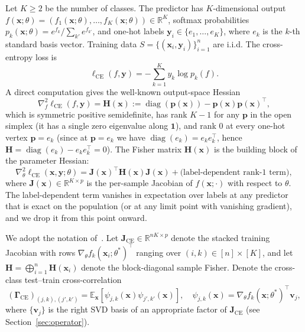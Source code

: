 \documentclass[12pt]{amsart}
\theoremstyle{definition}
\theoremstyle{remark}
\DeclareMathOperator{\diag}{diag}
\newcommand{\R}{\mathbb{R}}
\newcommand{\E}{\mathbb{E}}
\newcommand{\bx}{\mathbf{x}}
\newcommand{\bJ}{\mathbf{J}}
\newcommand{\bv}{\mathbf{v}}
\newcommand{\bp}{\mathbf{p}}
\newcommand{\bH}{\mathbf{H}}
\newcommand{\by}{\mathbf{y}}
\newcommand{\bGamma}{\boldsymbol{\Gamma}}
\begin{document}
Let $K \geq 2$ be the number of classes. The predictor has
$K$-dimensional output
$f(\bx;\theta) = (f_{1}(\bx;\theta),\ldots,f_{K}(\bx;\theta)) \in \R^{K}$,
softmax probabilities
$p_{k}(\bx;\theta) = e^{f_{k}}/\sum_{k'} e^{f_{k'}}$, and one-hot
labels $\by_{i} \in \{e_{1},\ldots,e_{K}\}$, where $e_{k}$ is the
$k$-th standard basis vector. Training data
$S = \{(\bx_{i},\by_{i})\}_{i=1}^{n}$ are i.i.d. The cross-entropy
loss is
\[
  \ell_{\mathrm{CE}}(f,\by) = -\sum_{k=1}^{K} y_{k}\log p_{k}(f).
\]
A direct computation gives the well-known output-space Hessian
\begin{equation}\label{eq:Hbox}
  \nabla_{f}^{2}\ell_{\mathrm{CE}}(f,\by) = \bH(\bx) := \diag(\bp(\bx)) - \bp(\bx)\bp(\bx)^{\top},
\end{equation}
which is symmetric positive semidefinite, has rank $K-1$ for any
$\bp$ in the open simplex (it has a single zero eigenvalue along
$\mathbf{1}$), and rank $0$ at every one-hot vertex
$\bp = e_{k}$ (since at $\bp = e_{k}$ we have
$\diag(e_{k}) = e_{k}e_{k}^{\top}$, hence
$\bH = \diag(e_{k}) - e_{k}e_{k}^{\top} = 0$).
The Fisher matrix $\bH(\bx)$ is the building block of the parameter
Hessian:
\begin{equation}\label{eq:CE-Hessian}
  \nabla_{\theta}^{2}\ell_{\mathrm{CE}}(\bx,\by;\theta)
  = \bJ(\bx)^{\top}\bH(\bx)\bJ(\bx) + \text{(label-dependent rank-1 term)},
\end{equation}
where $\bJ(\bx) \in \R^{K\times p}$ is the per-sample Jacobian of
$f(\bx;\cdot)$ with respect to $\theta$. The label-dependent term
vanishes in expectation over labels at any predictor that is exact
on the population (or at any limit point with vanishing gradient),
and we drop it from this point onward.

We adopt the notation of~\cite{paperA}. Let
$\bJ_{\mathrm{CE}} \in \R^{nK \times p}$ denote the stacked
training Jacobian with rows
$\nabla_{\theta} f_{k}(\bx_{i};\theta^{*})^{\top}$ ranging over
$(i,k) \in [n]\times[K]$, and let
$\bH = \bigoplus_{i=1}^{n}\bH(\bx_{i})$ denote the block-diagonal
sample Fisher. Denote the cross-class test--train cross-correlation
\begin{equation}\label{eq:GammaCE}
  (\bGamma_{\mathrm{CE}})_{(j,k),(j',k')} = \E_{\bx}[\psi_{j,k}(\bx)\psi_{j',k'}(\bx)],
  \quad \psi_{j,k}(\bx) = \nabla_{\theta} f_{k}(\bx;\theta^{*})^{\top}\bv_{j},
\end{equation}
where $\{\bv_{j}\}$ is the right SVD basis of an appropriate factor
of $\bJ_{\mathrm{CE}}$ (see Section~\ref{sec:operator}).
\end{document}
